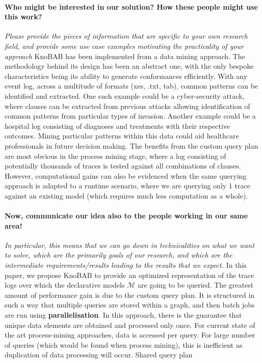 \paragraph*{Who might be interested in our solution? How these people might use this work?} \textit{Please provide the pieces of information that are specific to your own research field, and provide some use case examples motivating the practicality of your approach} KnoBAB has been implemented from a data mining approach. The methodology behind its design has been an abstract one, with the only bespoke characteristics being its ability to generate conformances efficiently. With any event log, across a multitude of formats (xes, .txt, tab), common patterns can be identified and extracted. One such example could be a cyber-security attack, where clauses can be extracted from previous attacks allowing identification of common patterns from particular types of invasion. Another example could be a hospital log consisting of diagnoses and treatments with their respective outcomes. Mining particular patterns within this data could aid healthcare professionals in future decision making. The benefits from the custom query plan are most obvious in the process mining stage, where a log consisting of potentially thousands of traces is tested against all combinations of clauses. However, computational gains can also be evidenced when the same querying approach is adapted to a runtime scenario, where we are querying only 1 trace against an existing model (which requires much less computation as a whole). 
\medskip


\paragraph*{Now, communicate our idea also to the people working in our same area!} \textit{In particular, this means that we can go down in technicalities on what we want to solve, which are the primarily goals of our research, and which are the intermediate requirements/results leading to the results that we expect.} 
In this paper, we propose KnoBAB to provide an optimized representation of the trace logs over which the declarative models $\mathcal{M}$ are going to be queried. The greatest amount of performance gain is due to the custom query plan. It is structured in such a way that multiple queries are stored within a graph, and then batch jobs are run using \textbf{parallelisation}. In this approach, there is the guarantee that unique data elements are obtained and processed only once. For current state of the art process-mining approaches, data is accessed per query. For large number of queries (which would be found when process mining), this is inefficient as duplication of data processing will occur. Shared query plan \cite{BellatrecheKB21}
